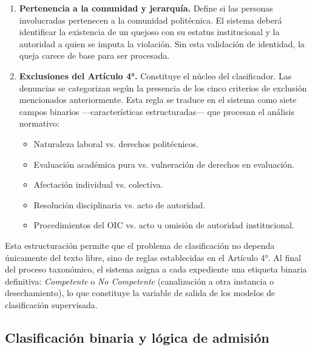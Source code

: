 \begin{enumerate}
  \item \textbf{Pertenencia a la comunidad y jerarquía.} Define si las personas
        involucradas pertenecen a la comunidad politécnica. El sistema deberá
        identificar la existencia de un quejoso con su estatus institucional y
        la autoridad a quien se imputa la violación. Sin esta validación de
        identidad, la queja carece de base para ser procesada.

  \item \textbf{Exclusiones del Artículo 4°.} Constituye el núcleo del
        clasificador. Las denuncias se categorizan según la presencia de los
        cinco criterios de exclusión mencionados anteriormente. Esta regla se
        traduce en el sistema como siete campos binarios —características
        estructuradas— que procesan el análisis normativo:
        \begin{itemize}
          \item Naturaleza laboral vs. derechos politécnicos.
          \item Evaluación académica pura vs. vulneración de derechos en
                evaluación.
          \item Afectación individual vs. colectiva.
          \item Resolución disciplinaria vs. acto de autoridad.
          \item Procedimientos del OIC vs. acto u omisión de autoridad
                institucional.
        \end{itemize}
\end{enumerate}

Esta estructuración permite que el problema de clasificación no dependa
únicamente del texto libre, sino de reglas establecidas en el Artículo 4°. Al
final del proceso taxonómico, el sistema asigna a cada expediente una etiqueta
binaria definitiva: \textit{Competente} o \textit{No Competente} (canalización
a otra instancia o desechamiento), lo que constituye la variable de salida de los
modelos de clasificación supervisada.

\subsection{Clasificación binaria y lógica de admisión}

